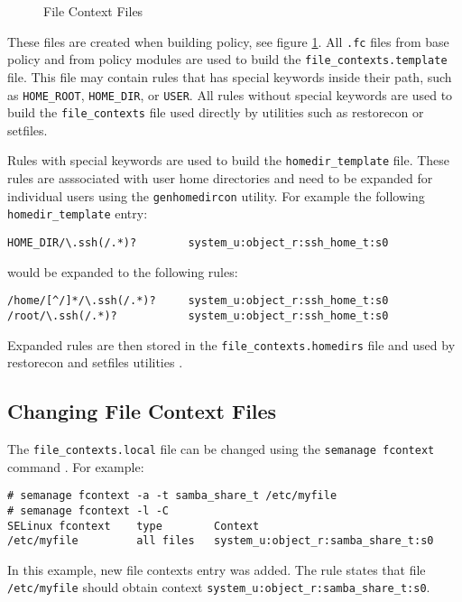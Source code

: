 \begin{figure}
    \centering
    \label{fig:filecontexts}
    
    \caption{File Context Files}
\end{figure}

These files are created when building policy, see figure \ref{fig:filecontexts}.
All \texttt{.fc} files from base policy and from policy modules are used to
build the \texttt{file\_contexts.template} file. This file may contain rules
that has special keywords inside their path, such as \texttt{HOME\_ROOT},
\texttt{HOME\_DIR}, or \texttt{USER}. All rules without special keywords are
used to build the \texttt{file\_contexts} file used directly by utilities such
as restorecon or setfiles.

Rules with special keywords are used to build the \texttt{homedir\_template}
file. These rules are asssociated with user home directories and need to be
expanded for individual users using the \texttt{genhomedircon} utility. For
example the following \texttt{homedir\_template} entry:
\begin{lstlisting}
HOME_DIR/\.ssh(/.*)?        system_u:object_r:ssh_home_t:s0
\end{lstlisting}
would be expanded to the following rules:
\begin{lstlisting}
/home/[^/]*/\.ssh(/.*)?     system_u:object_r:ssh_home_t:s0
/root/\.ssh(/.*)?           system_u:object_r:ssh_home_t:s0
\end{lstlisting}
Expanded rules are then stored in the \texttt{file\_contexts.homedirs} file and
used by restorecon and setfiles utilities \cite[pp.~134--140]{tsn}.

\subsection{Changing File Context Files}
The \texttt{file\_contexts.local} file can be changed using the \texttt{semanage
fcontext} command \cite{selinuxguide}. For example:
\begin{lstlisting}
# semanage fcontext -a -t samba_share_t /etc/myfile
# semanage fcontext -l -C
SELinux fcontext    type        Context
/etc/myfile         all files   system_u:object_r:samba_share_t:s0
\end{lstlisting}
In this example, new file contexts entry was added. The rule states that file
\texttt{/etc/myfile} should obtain context
\texttt{system\_u:object\_r:samba\_share\_t:s0}.

